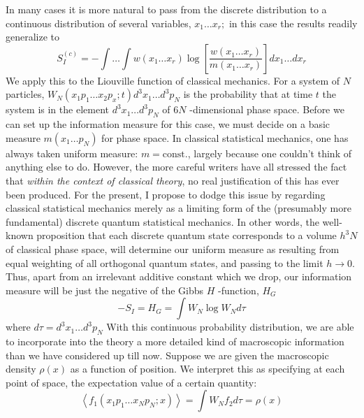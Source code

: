 \documentclass[]{article}
\begin{document}
In many cases it is more natural to pass from the discrete distribution to a continuous distribution of several variables, $x_{1} \ldots x_{r} ;$ in this case the results readily generalize to
\begin{equation}
S _{ I }^{( c )}=-\int \ldots \int w \left( x _{1} \ldots x _{ r }\right) \log \left[\frac{ w \left( x _{1} \ldots x _{ r }\right)}{ m \left( x _{1} \ldots x _{ r }\right)}\right] dx _{1} \ldots dx _{ r } \label{eqn-sixty-five}
\end{equation}
We apply this to the Liouville function of classical mechanics. For a system of $N$ particles, $W _{ N }\left( x _{1} p _{1} \ldots x _{2} p _{ x } ; t \right) d ^{3} x _{1} \ldots d ^{3} p _{ N }$ is the
probability that at time $t$ the system is in the element $d^{3} x_{1} \ldots d^{3} p_{N}$ of $6 N$ -dimensional phase space. Before we can set up the information measure for this case, we must decide on a basic measure $m\left(x_{1} \ldots p_{N}\right)$ for phase space. In classical statistical mechanics, one has always taken uniform measure: $m=\text{const}.$, largely because one couldn't think of anything else to do. However, the more careful writers have all stressed the fact that \emph{within the context of classical theory}, no real justification of this has ever been produced. For the present, I propose to dodge this issue by regarding classical statistical mechanics merely as a limiting form of the (presumably more fundamental) discrete quantum statistical mechanics. In other words, the well-known proposition that each discrete quantum state corresponds to a volume $h ^{3} N$ of classical phase space, will determine our uniform measure as resulting from equal weighting of all orthogonal quantum states, and passing to the limit $h \rightarrow 0$. Thus, apart from an irrelevant additive constant which we drop, our information measure will be just the negative of the Gibbs $H$ -function, $H _{ G }$
\begin{equation}
- S _{ I }= H _{ G }=\int W _{ N } \log W _{ N } d \tau
\end{equation}
where $d \tau= d ^{3} x _{1} \ldots d ^{3} p _{ N }$
With this continuous probability distribution, we are able to incorporate into the theory a more detailed kind of macroscopic information than we have considered up till now. Suppose we are given the macroscopic density $\rho(x)$ as a function of position. We interpret this as specifying at each point of space, the expectation value of a certain quantity:
\begin{equation}
\left\langle f_{1}\left(x_{1} p_{1} \ldots x_{N} p_{N} ; x\right)\right\rangle=\int W_{N} f_{2} d \tau=\rho(x)
\end{equation}
\end{document}
